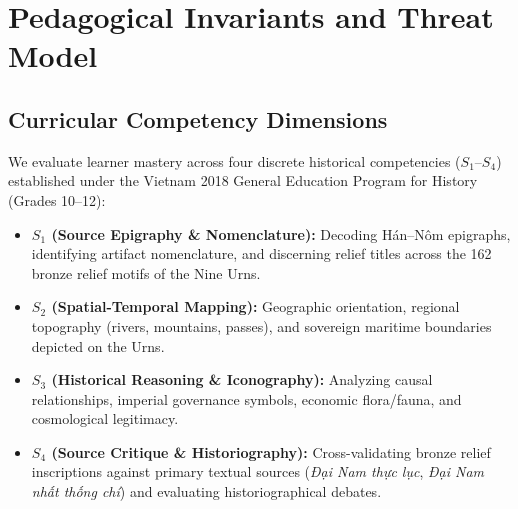 \documentclass[11pt,a4paper]{article}
\begin{document}
\section{Pedagogical Invariants and Threat Model}

\subsection{Curricular Competency Dimensions}
We evaluate learner mastery across four discrete historical competencies ($S_1$--$S_4$) established under the Vietnam 2018 General Education Program for History (Grades 10--12):
\begin{itemize}[leftmargin=*]
    \item \textbf{$S_1$ (Source Epigraphy \& Nomenclature):} Decoding Hán–Nôm epigraphs, identifying artifact nomenclature, and discerning relief titles across the 162 bronze relief motifs of the Nine Urns.
    \item \textbf{$S_2$ (Spatial-Temporal Mapping):} Geographic orientation, regional topography (rivers, mountains, passes), and sovereign maritime boundaries depicted on the Urns.
    \item \textbf{$S_3$ (Historical Reasoning \& Iconography):} Analyzing causal relationships, imperial governance symbols, economic flora/fauna, and cosmological legitimacy.
    \item \textbf{$S_4$ (Source Critique \& Historiography):} Cross-validating bronze relief inscriptions against primary textual sources (\textit{Đại Nam thực lục}, \textit{Đại Nam nhất thống chí}) and evaluating historiographical debates.
\end{itemize}
\end{document}
